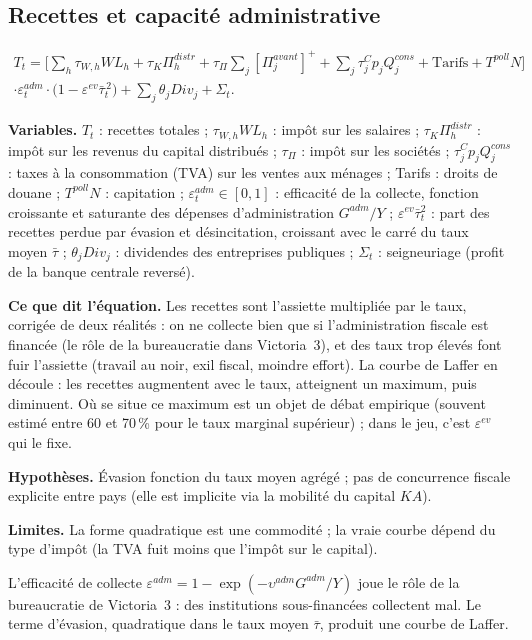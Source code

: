 \documentclass[11pt,a4paper]{article}
\newcommand{\variables}{\par\noindent\textbf{Variables.} }
\newcommand{\sens}{\par\noindent\textbf{Ce que dit l'équation.} }
\newcommand{\hyp}{\par\noindent\textbf{Hypothèses.} }
\newcommand{\limites}{\par\noindent\textbf{Limites.} }
\newcommand{\pos}[1]{{\left[#1\right]^{+}}}
\begin{document}
\subsection{Recettes et capacité administrative}
\begin{equation}
\begin{split}
T_t = \Big[\sum_h \tau_{W,h} W L_h + \tau_K \Pi^{distr}_h + \tau_\Pi \sum_j \pos{\Pi^{avant}_j} + \sum_j \tau^C_j p_j Q^{cons}_j + \text{Tarifs} + T^{poll} N \Big]\\
\cdot \varepsilon^{adm}_t \cdot \big(1 - \varepsilon^{ev} \bar\tau_t^{\,2}\big) + \sum_j \theta_j Div_j + \Sigma_t .
\end{split}
\end{equation}
\begin{lecture}
\variables $T_t$ : recettes totales ; $\tau_{W,h}WL_h$ : impôt sur les salaires ; $\tau_K\Pi^{distr}_h$ : impôt sur les revenus du capital distribués ; $\tau_\Pi$ : impôt sur les sociétés ; $\tau^C_j p_jQ^{cons}_j$ : taxes à la consommation (TVA) sur les ventes aux ménages ; Tarifs : droits de douane ; $T^{poll}N$ : capitation ; $\varepsilon^{adm}_t\in[0,1]$ : efficacité de la collecte, fonction croissante et saturante des dépenses d'administration $G^{adm}/Y$ ; $\varepsilon^{ev}\bar\tau^2_t$ : part des recettes perdue par évasion et désincitation, croissant avec le carré du taux moyen $\bar\tau$ ; $\theta_jDiv_j$ : dividendes des entreprises publiques ; $\Sigma_t$ : seigneuriage (profit de la banque centrale reversé).
\sens Les recettes sont l'assiette multipliée par le taux, corrigée de deux réalités : on ne collecte bien que si l'administration fiscale est financée (le rôle de la bureaucratie dans Victoria~3), et des taux trop élevés font fuir l'assiette (travail au noir, exil fiscal, moindre effort). La courbe de Laffer en découle : les recettes augmentent avec le taux, atteignent un maximum, puis diminuent. Où se situe ce maximum est un objet de débat empirique (souvent estimé entre 60 et 70\,\% pour le taux marginal supérieur) ; dans le jeu, c'est $\varepsilon^{ev}$ qui le fixe.
\hyp Évasion fonction du taux moyen agrégé ; pas de concurrence fiscale explicite entre pays (elle est implicite via la mobilité du capital $KA$).
\limites La forme quadratique est une commodité ; la vraie courbe dépend du type d'impôt (la TVA fuit moins que l'impôt sur le capital).
\end{lecture}
L'efficacité de collecte $\varepsilon^{adm} = 1 - \exp(-\upsilon^{adm} G^{adm}/Y)$ joue le rôle de la bureaucratie de Victoria~3 : des institutions sous-financées collectent mal. Le terme d'évasion, quadratique dans le taux moyen $\bar\tau$, produit une courbe de Laffer.
\end{document}

